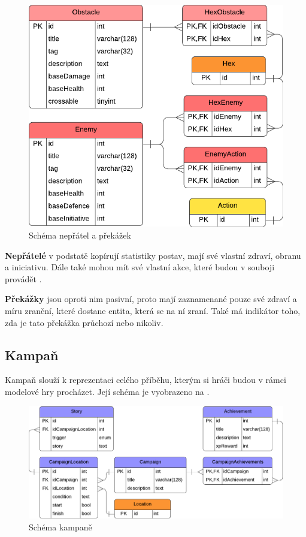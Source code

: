 \begin{figure}[h]
    \centering
    \includegraphics{../../shared/diagrams/er_enemy_obstacle.pdf}
    \caption{Schéma nepřátel a překážek}
    \label{diag:er_enemy_obstacle}
\end{figure}

\textbf{Nepřátelé} v podstatě kopírují statistiky postav, mají své vlastní zdraví, obranu a iniciativu. Dále také mohou mít své vlastní akce, které budou v souboji provádět .

\textbf{Překážky} jsou oproti nim pasivní, proto mají zaznamenané pouze své zdraví a míru zranění, které dostane entita, která se na ní zraní. Také má indikátor toho, zda je tato překážka průchozí  nebo nikoliv.


\subsection{Kampaň}
\label{subsec:schema_campaign}

Kampaň slouží k reprezentaci celého příběhu, kterým si hráči budou v rámci modelové hry procházet. Její schéma je vyobrazeno na .

\begin{figure}[h]
    \centering
    \includegraphics[scale=0.8]{../../shared/diagrams/er_campaign.pdf}
    \caption{Schéma kampaně}
    \label{diag:er_campaign}
\end{figure}

